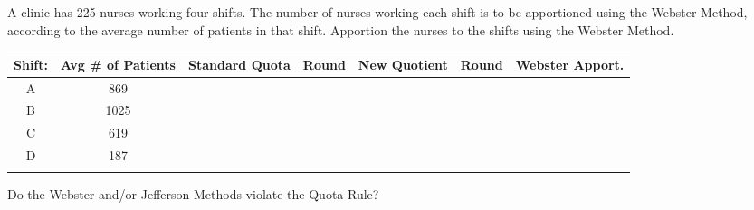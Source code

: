 \documentclass[11pt,epsfig]{article}
\begin{document}
\begin{problem}{10}
A clinic has 225 nurses working four shifts. The number of nurses working each shift is to be apportioned using the Webster Method, according to the average number of patients in that shift. Apportion the nurses to the shifts using the Webster Method.

 \begin{center}
 \begin{tabular}{ | c | c | c | c | c | c | c |}
   \hline
   Shift: & Avg \# of Patients & Standard Quota  & Round  & New Quotient & Round &Webster Apport.\\ \hline
   A & 869 &  &  &  &  &  \\ \hline
   B & 1025 &  &  &  &  & \\ \hline
   C & 619 &  &  &  & &  \\ \hline
   D & 187 &  &  &  &  & \\ \hline
    &  &  &  &  & &  \\ \hline
   \end{tabular}
  \end{center}

\vfill
\end{problem}

\begin{problem}{2}
Do the Webster and/or Jefferson Methods violate the Quota Rule?

\vfill
\end{problem}

\showpoints
\end{document}
